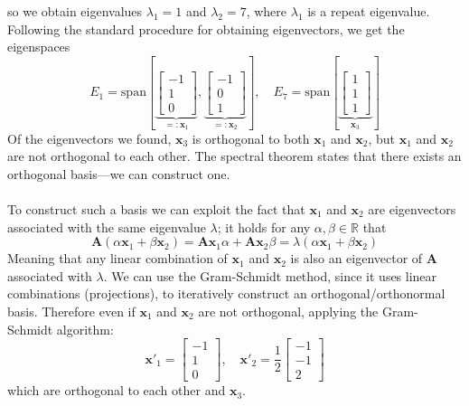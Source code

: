 \documentclass{report}
\begin{document}
so we obtain eigenvalues $\lambda_1=1$ and $\lambda_2=7$, where $\lambda_1$ is a repeat eigenvalue. 
Following the standard procedure for obtaining eigenvectors, we get the eigenspaces
\begin{equation*}
E_1=\text{span}[\underbrace{\begin{bmatrix}-1\\1\\0\end{bmatrix}}_{=:\bm{x}_1},
\underbrace{\begin{bmatrix}-1\\0\\1\end{bmatrix}}_{=:\bm{x}_2}],\quad
E_7=\text{span}[\underbrace{\begin{bmatrix}1\\1\\1\end{bmatrix}}_{\bm{x}_3}]
\end{equation*}
Of the eigenvectors we found, $\bm{x}_3$ is orthogonal to both $\bm{x}_1$ and $\bm{x}_2$, but $\bm{x}_1$ and 
$\bm{x}_2$ are not orthogonal to each other. The spectral
theorem states that there exists an orthogonal basis---we can construct one.\\
\vspace{1mm}\\
To construct such a basis we can exploit the fact that $\bm{x}_1$ and $\bm{x}_2$ are eigenvectors associated with
the same eigenvalue $\lambda$; it holds for any $\alpha,\beta\in\mathbb{R}$ that
\begin{equation*}
\bm{A}(\alpha\bm{x}_1+\beta\bm{x}_2)=
\bm{A}\bm{x}_1\alpha+\bm{A}\bm{x}_2\beta=
\lambda(\alpha\bm{x}_1+\beta\bm{x}_2)
\end{equation*}
Meaning that any linear combination of $\bm{x}_1$ and $\bm{x}_2$ is also an eigenvector of $\bm{A}$ associated
with $\lambda$. We can use the Gram-Schmidt method, since it uses linear combinations (projections), to 
iteratively construct an orthogonal/orthonormal basis.
Therefore even if $\bm{x}_1$ and $\bm{x}_2$ are not orthogonal, applying the Gram-Schmidt algorithm:
\begin{equation*}
\bm{x}'_1=\begin{bmatrix}-1\\1\\0\end{bmatrix},\quad
\bm{x}'_2=\frac{1}{2}\begin{bmatrix}-1\\-1\\2
\end{bmatrix}
\end{equation*}
which are orthogonal to each other and $\bm{x}_3$.
\newpage
\end{document}
